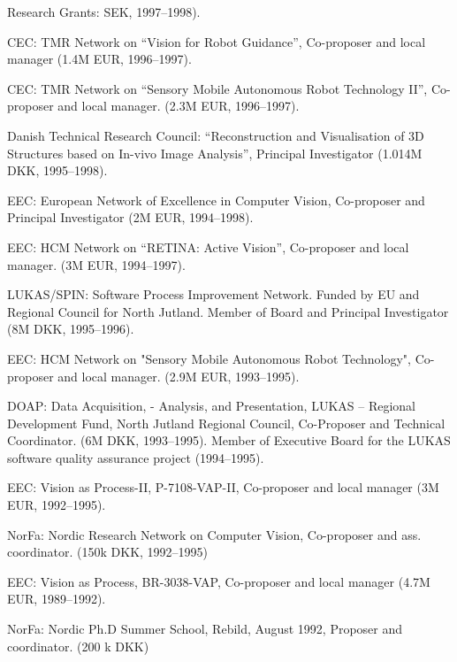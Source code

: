 \documentclass{article}
\begin{document}
\begin{cv}
\begin{cvlist}{Research Grants:}
		SEK, 1997--1998).%
		\item CEC: TMR Network on ``Vision for Robot Guidance'', Co-proposer
		and local manager (1.4M EUR, 1996--1997).%
		\item CEC: TMR Network on ``Sensory Mobile Autonomous Robot Technology
		II'', Co-proposer and local manager.  (2.3M EUR, 1996--1997).%
		\item Danish Technical Research Council: ``Reconstruction and
		Visualisation of 3D Structures based on In-vivo Image Analysis'',
		Principal Investigator (1.014M DKK, 1995--1998).%
		\item EEC: European Network of Excellence in Computer Vision,
		Co-proposer and Principal Investigator (2M EUR, 1994--1998).%
		\item EEC: HCM Network on ``RETINA: Active Vision'', Co-proposer and
		local manager.  (3M EUR, 1994--1997).%
		\item LUKAS/SPIN: Software Process Improvement Network. Funded by EU
		and Regional Council for North Jutland. Member of Board and
		Principal Investigator (8M DKK, 1995--1996).%
		\item EEC: HCM Network on "Sensory Mobile Autonomous Robot
		Technology", Co-proposer and local manager.  (2.9M EUR,
		1993--1995).%
		\item DOAP: Data Acquisition, - Analysis, and Presentation, LUKAS --
		Regional Development Fund, North Jutland Regional Council,
		Co-Proposer and Technical Coordinator. (6M DKK, 1993--1995). Member
		of  Executive Board for the LUKAS software quality assurance project
		(1994--1995).%
		\item EEC: Vision as Process-II, P-7108-VAP-II, Co-proposer and local
		manager (3M EUR, 1992--1995).%
		\item NorFa: Nordic Research Network on Computer Vision, Co-proposer
		and ass. coordinator.  (150k DKK, 1992--1995)%
		\item EEC: Vision as Process, BR-3038-VAP, Co-proposer and local
		manager (4.7M EUR, 1989--1992).%
		\item NorFa: Nordic Ph.D Summer School, Rebild, August 1992, Proposer
		and coordinator. (200 k DKK)%
	\end{cvlist}


\end{cv}
\end{document}
